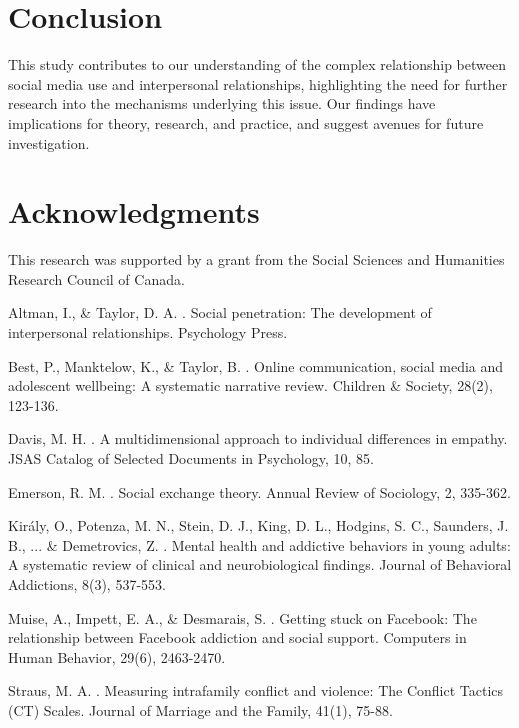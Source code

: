 \documentclass[12pt,a4paper]{article}
\begin{document}
\section{Conclusion}
This study contributes to our understanding of the complex relationship between social media use and interpersonal relationships, highlighting the need for further research into the mechanisms underlying this issue. Our findings have implications for theory, research, and practice, and suggest avenues for future investigation.

\section*{Acknowledgments}
This research was supported by a grant from the Social Sciences and Humanities Research Council of Canada.


\begin{thebibliography}{99}

Altman, I., \& Taylor, D. A. . Social penetration: The development of interpersonal relationships. Psychology Press.

Best, P., Manktelow, K., \& Taylor, B. . Online communication, social media and adolescent wellbeing: A systematic narrative review. Children \& Society, 28(2), 123-136.

Davis, M. H. . A multidimensional approach to individual differences in empathy. JSAS Catalog of Selected Documents in Psychology, 10, 85.

Emerson, R. M. . Social exchange theory. Annual Review of Sociology, 2, 335-362.

Király, O., Potenza, M. N., Stein, D. J., King, D. L., Hodgins, S. C., Saunders, J. B., ... \& Demetrovics, Z. . Mental health and addictive behaviors in young adults: A systematic review of clinical and neurobiological findings. Journal of Behavioral Addictions, 8(3), 537-553.

Muise, A., Impett, E. A., \& Desmarais, S. . Getting stuck on Facebook: The relationship between Facebook addiction and social support. Computers in Human Behavior, 29(6), 2463-2470.

Straus, M. A. . Measuring intrafamily conflict and violence: The Conflict Tactics (CT) Scales. Journal of Marriage and the Family, 41(1), 75-88.

\end{thebibliography}
\end{document}
